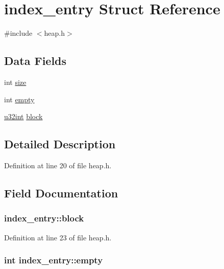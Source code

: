 \hypertarget{structindex__entry}{}\section{index\+\_\+entry Struct Reference}
\label{structindex__entry}


{\ttfamily \#include $<$heap.\+h$>$}

\subsection*{Data Fields}
\begin{DoxyCompactItemize}
\item 
int \hyperlink{structindex__entry_a2b0247aae5c7f9884f8eef1ee121adb0}{size}
\item 
int \hyperlink{structindex__entry_afdbdffb4bd17e4ab003b94be3d5bade7}{empty}
\item 
\hyperlink{system_8h_a757de76cafbcddaac0d1632902fe4cb8}{u32int} \hyperlink{structindex__entry_a0a8d4dc0595b5f2ef42e7080c5221c1f}{block}
\end{DoxyCompactItemize}


\subsection{Detailed Description}


Definition at line 20 of file heap.\+h.



\subsection{Field Documentation}
\subsubsection[{\texorpdfstring{block}{block}}]{ index\+\_\+entry\+::block}\hypertarget{structindex__entry_a0a8d4dc0595b5f2ef42e7080c5221c1f}{}\label{structindex__entry_a0a8d4dc0595b5f2ef42e7080c5221c1f}


Definition at line 23 of file heap.\+h.

\subsubsection[{\texorpdfstring{empty}{empty}}]{\setlength{\rightskip}{0pt plus 5cm}int index\+\_\+entry\+::empty}\hypertarget{structindex__entry_afdbdffb4bd17e4ab003b94be3d5bade7}{}\label{structindex__entry_afdbdffb4bd17e4ab003b94be3d5bade7}


